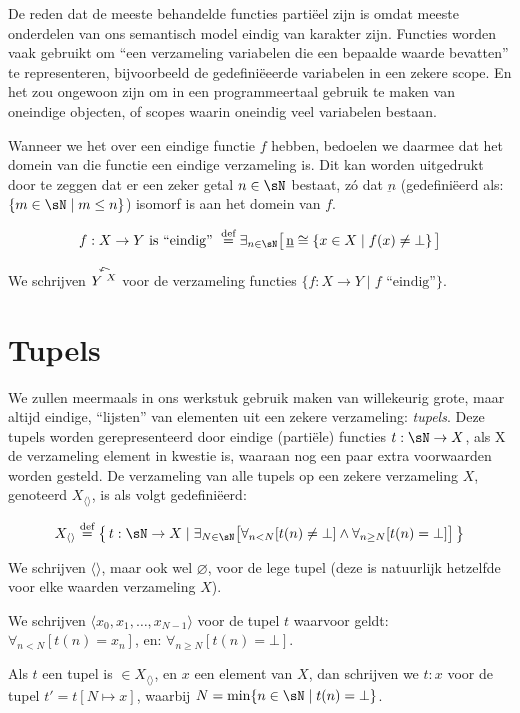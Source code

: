 De reden dat de meeste behandelde functies partiëel zijn is omdat meeste onderdelen van ons semantisch model eindig van karakter zijn. Functies worden vaak gebruikt om ``een verzameling variabelen die een bepaalde waarde bevatten'' te representeren, bijvoorbeeld de gedefiniëeerde variabelen in een zekere scope. En het zou ongewoon zijn om in een programmeertaal gebruik te maken van oneindige objecten, of scopes waarin oneindig veel variabelen bestaan.

Wanneer we het over een eindige functie $f$ hebben, bedoelen we daarmee dat het domein van die functie een eindige verzameling is. Dit kan worden uitgedrukt door te zeggen dat er een zeker getal $n \in \sN$ bestaat, zó dat $\underbar{n}$ (gedefiniëerd als: $\{m \in \sN \mid m \le n\}$) isomorf is aan het domein van $f$.

$$ f : X \to Y \text{ is ``eindig'' } \DEF \exists_{n \in \sN} \surr{ \underbar{n} \cong \{ x \in X \mid f(x) \neq \bot \} } $$

We schrijven $\FiniteFunctions{Y}{X}$ voor de verzameling functies $\{f : X \to Y \mid f \text{ ``eindig''} \}$.

\section{Tupels}

We zullen meermaals in ons werkstuk gebruik maken van willekeurig grote, maar altijd eindige, ``lijsten'' van elementen uit een zekere verzameling: \emph{tupels}. Deze tupels worden gerepresenteerd door eindige (partiële) functies $t : \sN \to X$, als X de verzameling element in kwestie is, waaraan nog een paar extra voorwaarden worden gesteld. De verzameling van alle tupels op een zekere verzameling $X$, genoteerd $X_{\langle\rangle}$, is als volgt gedefiniëerd:

$$ X_{\langle\rangle} \DEF \big\{\, t : \sN \to X \mid \exists_{N \in \sN} \big[ \forall_{n < N}[t(n) \neq \bot] \land \forall_{n\ge N}[t(n) = \bot] \big] \,\big\} $$

We schrijven $\langle\rangle$, maar ook wel $\varnothing$, voor de lege tupel (deze is natuurlijk hetzelfde voor elke waarden verzameling $X$).

We schrijven $\langle x_0, x_1, \dots, x_{N-1}\rangle$ voor de tupel $t$ waarvoor geldt: $\forall_{n < N}[t(n) = x_n]$, en: $\forall_{n \ge N}[t(n) = \bot]$.

Als $t$ een tupel is $\in X_{\langle\rangle}$, en $x$ een element van $X$, dan schrijven we $t:x$ voor de tupel $t' = t[N \mapsto x]$, waarbij $N = \min\{n\in\sN \mid t(n) = \bot\}$.

